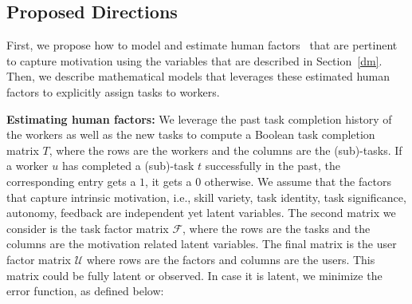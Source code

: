 

\vspace{-0.1in}
\subsection{Proposed Directions}
\vspace{-0.1in}
First, we propose how to model and estimate human factors~\cite{hf1,motiv00,motiv0,motiv1,motiv2,motiv3,motiv4} that are pertinent to capture motivation using the variables that are described in Section~\ref{dm}. Then, we describe mathematical models that leverages these estimated human factors to explicitly assign tasks to workers. 

{\bf Estimating human factors:} We leverage the past task completion history of the workers as well as the new tasks to compute a Boolean task completion matrix $T$, where the rows are the workers and the columns are the (sub)-tasks. If a worker $u$ has completed a (sub)-task $t$ successfully in the past, the corresponding entry gets a $1$, it gets a $0$ otherwise. We assume that the factors that capture intrinsic motivation, i.e., skill variety, task identity, task significance, autonomy, feedback are independent yet latent variables. The second matrix we consider is the task factor matrix $\mathcal{F}$, where the rows are the tasks and the columns are the motivation related latent variables.  The final matrix is the user factor matrix $\mathcal{U}$ where rows are the factors and columns are the users. This matrix could be fully latent or observed.  In case it is latent, we minimize the error function, as defined below:

